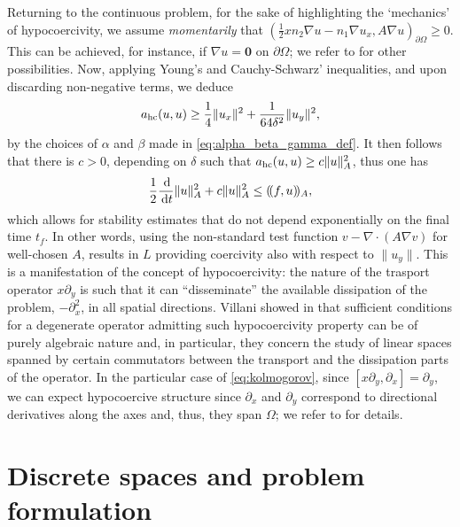 \documentclass{amsart}
\newcommand{\norm}[2]{\|{#1}\|_{{#2}}}
\newcommand{\ud}{\,{\rm d}}
\newcommand{\Ainner}[2]{(\!({#1},{#2})\!)_A}
\theoremstyle{definition}
\theoremstyle{remark}
\numberwithin{equation}{section}
\begin{document}
Returning to the continuous problem, for the sake of highlighting the `mechanics' of hypocoercivity, we assume \emph{momentarily} that $(\frac{1}{2}xn_2\nabla u-n_1\nabla u_{x}, A\nabla u)_{\partial\Omega}\ge 0$.  This can be achieved, for instance, if $\nabla u=\mathbf{0}$ on $\partial\Omega$; we refer to \cite{georgoulis} for other possibilities. Now, applying Young's and Cauchy-Schwarz' inequalities, and upon discarding  non-negative terms, we deduce
\begin{equation}\label{eq:hypoco}
    a_{\rm hc}(u,u)\ge
    \frac{1}{4}\|u_x\|^2
    +
    \frac{1}{64 \delta^2} \|u_y\|^2,
\end{equation}
by the choices of $\alpha$ and $\beta$ made in \eqref{eq:alpha_beta_gamma_def}.
It then follows that there is $c>0$, depending on $\delta$ such that $a_{\rm hc}(u,u) \geq c\norm{u}{A}^2$, thus one has
\begin{equation}
\frac{1}{2}	\frac{\ud }{\ud t } \norm{u}{A}^2+ c \norm{u}{A}^2 \leq \Ainner{f}{u},
\end{equation}
which allows for stability estimates that do not depend exponentially on the final time $t_f$. In other words, using the non-standard test function $v-\nabla\cdot (A\nabla v)$ for well-chosen $A$, results in $L$ providing coercivity also with respect to $\|u_y\|$.
This is a manifestation of the concept of hypocoercivity: the nature of the trasport operator $x\partial_y$ is such that it can ``disseminate'' the available dissipation  of the problem, $-\partial_{x}^2$, in all spatial directions. Villani showed in \cite{villani} that sufficient conditions for a degenerate operator admitting such hypocoercivity property can be of purely algebraic nature and, in particular, they concern the study of linear spaces spanned by certain commutators between the transport and the dissipation parts of the operator. In the particular case of \eqref{eq:kolmogorov}, since $[x\partial_y,\partial_x]=\partial_y$, we can expect hypocoercive structure since $\partial_x$ and $\partial_y$ correspond to directional derivatives along the axes and, thus, they span $\Omega$; we refer to \cite[Theorem 24]{villani} for details.





\section{Discrete spaces and problem formulation} \label{sec:method}
\end{document}
